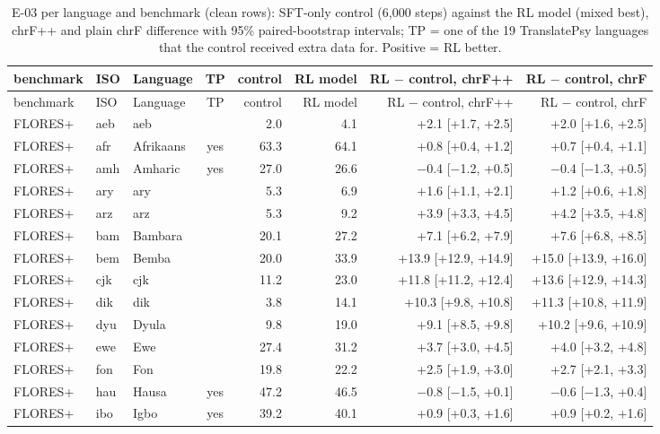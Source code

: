 {\scriptsize\setlength{\tabcolsep}{1.5pt}
\begin{longtable}{@{}lllcrrrr@{}}
\caption{E-03 per language and benchmark (clean rows): SFT-only control (6,000 steps) against the RL model (mixed best), chrF++ and plain chrF difference with 95\% paired-bootstrap intervals; TP = one of the 19 TranslatePsy languages that the control received extra data for. Positive = RL better.}\label{tab:e03-per-language}\\
\toprule
benchmark & ISO & Language & TP & control & RL model & RL $-$ control, chrF++ & RL $-$ control, chrF \\
\midrule\endfirsthead
\toprule
benchmark & ISO & Language & TP & control & RL model & RL $-$ control, chrF++ & RL $-$ control, chrF \\
\midrule\endhead
\midrule\endfoot
\bottomrule\endlastfoot
FLORES+ & aeb & aeb &  & 2.0 & 4.1 & +2.1 [+1.7, +2.5] & +2.0 [+1.6, +2.5] \\
FLORES+ & afr & Afrikaans & yes & 63.3 & 64.1 & +0.8 [+0.4, +1.2] & +0.7 [+0.4, +1.1] \\
FLORES+ & amh & Amharic & yes & 27.0 & 26.6 & $-$0.4 [$-$1.2, +0.5] & $-$0.4 [$-$1.3, +0.5] \\
FLORES+ & ary & ary &  & 5.3 & 6.9 & +1.6 [+1.1, +2.1] & +1.2 [+0.6, +1.8] \\
FLORES+ & arz & arz &  & 5.3 & 9.2 & +3.9 [+3.3, +4.5] & +4.2 [+3.5, +4.8] \\
FLORES+ & bam & Bambara &  & 20.1 & 27.2 & +7.1 [+6.2, +7.9] & +7.6 [+6.8, +8.5] \\
FLORES+ & bem & Bemba &  & 20.0 & 33.9 & +13.9 [+12.9, +14.9] & +15.0 [+13.9, +16.0] \\
FLORES+ & cjk & cjk &  & 11.2 & 23.0 & +11.8 [+11.2, +12.4] & +13.6 [+12.9, +14.3] \\
FLORES+ & dik & dik &  & 3.8 & 14.1 & +10.3 [+9.8, +10.8] & +11.3 [+10.8, +11.9] \\
FLORES+ & dyu & Dyula &  & 9.8 & 19.0 & +9.1 [+8.5, +9.8] & +10.2 [+9.6, +10.9] \\
FLORES+ & ewe & Ewe &  & 27.4 & 31.2 & +3.7 [+3.0, +4.5] & +4.0 [+3.2, +4.8] \\
FLORES+ & fon & Fon &  & 19.8 & 22.2 & +2.5 [+1.9, +3.0] & +2.7 [+2.1, +3.3] \\
FLORES+ & hau & Hausa & yes & 47.2 & 46.5 & $-$0.8 [$-$1.5, +0.1] & $-$0.6 [$-$1.3, +0.4] \\
FLORES+ & ibo & Igbo & yes & 39.2 & 40.1 & +0.9 [+0.3, +1.6] & +0.9 [+0.2, +1.6] \\

\end{longtable}}
